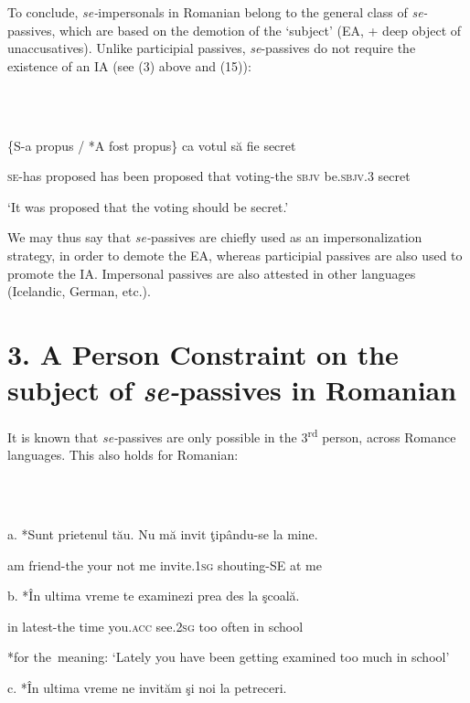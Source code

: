 \documentclass[output=paper]{langsci/langscibook}
\begin{document}
  To conclude, \textit{se-}impersonals in Romanian belong to the general class of \textit{se-}passives, which are based on the demotion of the ‘subject’ (EA, + deep object of unaccusatives). Unlike participial passives, \textit{se}{}-passives do not require the existence of an IA (see (3) above and (15)):

\ea%
    \label{ex:key:15}
    \gll\\
        \\
    \glt
    \z

          \{S-a      propus    / *A   fost   propus\}   ca   votul          să     fie           secret

  \textsc{se-}has proposed    has been proposed that voting-the \textsc{sbjv} be.\textsc{sbjv.3} secret

‘It was proposed that the voting should be secret.’

We may thus say that \textit{se-}passives are chiefly used as an impersonalization strategy, in order to demote the EA, whereas participial passives are also used to promote the IA. Impersonal passives are also attested in other languages (Icelandic, German, etc.).

\section{ 3. A Person Constraint on the subject of \textit{se-}passives in Romanian}

It is known that \textit{se-}passives are only possible in the 3\textsuperscript{rd} person, across Romance languages. This also holds for Romanian:

\ea%
    \label{ex:key:16}
    \gll\\
        \\
    \glt
    \z

          a.   *Sunt prietenul  tău.   Nu mă invit           ţipându-se   la mine.  

          am   friend-the your not me invite.1\textsc{sg} shouting-SE at me              

  b.   *În ultima     vreme te           examinezi  prea des     la şcoală.      

              in latest-the time   you.\textsc{acc} see.\textsc{2sg}      too   often in school 

            *for the~meaning: ‘Lately you have been getting examined too much in school’

  c.   *În ultima     vreme ne      invităm     şi    noi       la petreceri.  
\end{document}
